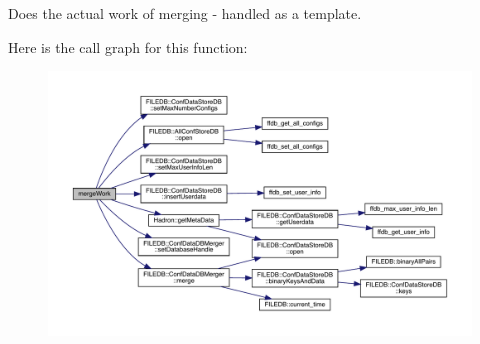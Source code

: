 Does the actual work of merging -\/ handled as a template. 

Here is the call graph for this function\+:
\nopagebreak
\begin{figure}[H]
\begin{center}
\leavevmode
\includegraphics[width=350pt]{db/d3c/adat-devel_2main_2dbutil_2dbmerge_8cc_a6c8a139a4e0f3c2eb65b1a9828dc910a_cgraph}
\end{center}
\end{figure}
